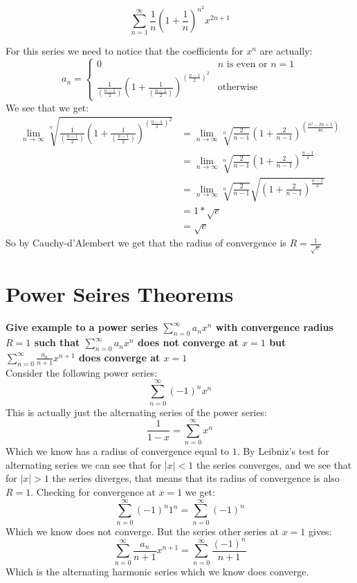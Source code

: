 \documentclass{article}
\theoremstyle{plain}
\begin{document}
	\newpage
	
	\[
	\sum_{n=1}^{\infty}{\frac{1}{n}\left(1+\frac{1}{n}\right)^{n^2}x^{2n+1}}
	\]
	
	For this series we need to notice that the coefficients for $x^n$ are
	actually:
	\[
	a_n = 
		\begin{cases}
			0 & \text{$n$ is even or $n=1$} \\
			\frac{1}{(\frac{n-1}{2})}\left(1+\frac{1}{(\frac{n-1}{2})
			}\right)^{(\frac{n-1}{2})^2} & \text{otherwise}
		\end{cases}
	\]
	We see that we get:
	\begin{align*}
		\lim_{n\to\infty}
		{
			\sqrt[n]
			{\frac{1}{(\frac{n-1}{2})}\left(1+\frac{1}{(\frac{n-1}{2})
			}\right)^{(\frac{n-1}{2})^2}}
		} &= 
		\lim_{n\to\infty}
		{
			\sqrt[n]{\frac{2}{n-1}}\left(1+\frac{2}{n-1
			}\right)^{(\frac{n^2-2n+1}{4n})}
		} \\ &= 
		\lim_{n\to\infty}
		{
			\sqrt[n]
			{\frac{2}{n-1}}\left(1+\frac{2}{n-1}\right)^{\frac{n-1}{4}}
		} \\ &= 
		\lim_{n\to\infty}
		{
			\sqrt[n]{\frac{2}{n-1}}
			\sqrt{\left(1+\frac{2}{n-1}\right)^{\frac{n-1}{2}}}
		} \\ &= 1*\sqrt{e} \\ &= \sqrt{e}
	\end{align*}
	So by Cauchy-d'Alembert we get that the radius of convergence is 
	$R = \frac{1}{\sqrt{e}}$
	
	\newpage
	
	\section{Power Seires Theorems}
	
	\textbf{Give example to a power series $\sum_{n=0}^{\infty}{a_n x^n}$ 
	with convergence radius $R=1$ such that $\sum_{n=0}^{\infty}{a_n x^n}$ 
	does not converge at $x=1$ but 
	$\sum_{n=0}^{\infty}{\frac{a_n}{n+1} x^{n+1}}$ does converge at $x=1$} \\
	Consider the following power series:
	\[
		\sum_{n=0}^{\infty}{(-1)^n x^n}
	\]
	This is actually just the alternating series of the power series:
	\[
		\frac{1}{1-x} = \sum_{n=0}^{\infty}{x^n}
	\]
	Which we know has a radius of convergence equal to $1$. By Leibniz's
	test for alternating series we can see that for $|x| < 1$ the series
	converges, and we see that for $|x| > 1$ the series diverges, that
	means that its radius of convergence is also $R=1$. Checking for 
	convergence at $x=1$ we get:
	\[
		\sum_{n=0}^{\infty}{(-1)^n 1^n} = 
		\sum_{n=0}^{\infty}{(-1)^n}
	\]
	Which we know does not converge. But the series other series at $x=1$ 
	gives:
	\[
		\sum_{n=0}^{\infty}{\frac{a_n}{n+1} x^{n+1}} =
		\sum_{n=0}^{\infty}{\frac{(-1)^n}{n+1}}
	\]
	Which is the alternating harmonic series which we know does converge.
	
\end{document}
